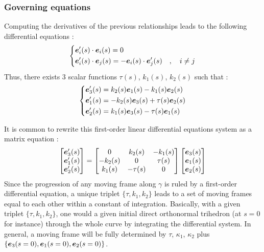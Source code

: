 \subsubsection{Governing equations}
Computing the derivatives of the previous relationships leads to the following differential equations :
\begin{equation}
	\left\{
	\begin{aligned}
		&\boldsymbol{e}'_i(s) \cdot \boldsymbol{e}_i(s) = 0 \\
		&\boldsymbol{e}'_{i}(s) \cdot \boldsymbol{e}_{j}(s) = -\boldsymbol{e}_{i}(s) \cdot \boldsymbol{e}'_{j}(s)\quad , \quad i \neq j
	\end{aligned}
	\right.
\end{equation}
Thus, there exists 3 scalar functions $\tau(s)$, $k_{1}(s)$, $k_{2}(s)$ such that :
\begin{equation}
	\left\{
	\begin{aligned}
		&\boldsymbol{e}'_{3}(s) = k_{2}(s)\boldsymbol{e}_{1}(s) - k_{1}(s)\boldsymbol{e}_{2}(s) \\
		&\boldsymbol{e}'_{1}(s) = -k_{2}(s)\boldsymbol{e}_{3}(s) + \tau(s)\boldsymbol{e}_{2}(s) \\
		&\boldsymbol{e}'_{2}(s) = k_{1}(s)\boldsymbol{e}_{3}(s) - \tau(s)\boldsymbol{e}_{1}(s)
	\end{aligned}
	\right.
\end{equation}

It is common to rewrite this first-order linear differential equations system as a matrix equation :
\begin{equation}
	\begin{bmatrix}
		\boldsymbol{e}'_{3}(s) \\
		\boldsymbol{e}'_{1}(s) \\
		\boldsymbol{e}'_{2}(s)
	\end{bmatrix}
	=
	\begin{bmatrix}
		0 & k_{2}(s) & -k_{1}(s) \\
		-k_{2}(s) & 0 & \tau(s) \\
		k_{1}(s) & -\tau(s) & 0
	\end{bmatrix}
	\begin{bmatrix}
		\boldsymbol{e}_{3}(s) \\
		\boldsymbol{e}_{1}(s) \\
		\boldsymbol{e}_{2}(s)
	\end{bmatrix}
\label{eq:3_12}
\end{equation}
Since the progression of any moving frame along $\gamma$ is ruled by a first-order differential equation, a unique triplet $\{\tau, k_{1}, k_{2}\}$ leads to a set of moving frames equal to each other within a constant of integration. Basically, with a given triplet $\{\tau, k_{1}, k_{2}\}$, one would  a given initial direct orthonormal trihedron (at $s=0$ for instance) through the whole curve by integrating the differential system. In general, a moving frame will be fully determined by $\tau$, $\kappa_{1}$, $\kappa_{2}$ plus $\{\boldsymbol{e}_{3}(s=0),\boldsymbol{e}_{1}(s=0),\boldsymbol{e}_{2}(s=0)\}$.


